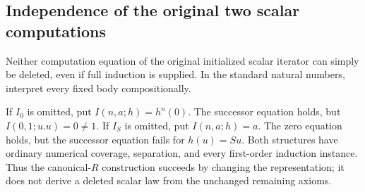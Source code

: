 \subsection{Independence of the original two scalar computations}

Neither computation equation of the original initialized scalar iterator
can simply be deleted, even if full induction is supplied. In the standard
natural numbers, interpret every fixed body compositionally.

If $I_0$ is omitted, put $I(n,a;h)=h^n(0)$. The successor equation holds,
but $I(0,1;u.u)=0\ne1$. If $I_S$ is omitted, put $I(n,a;h)=a$. The zero
equation holds, but the successor equation fails for $h(u)=Su$.
Both structures have ordinary numerical coverage, separation, and every
first-order induction instance. Thus the canonical-$R$ construction succeeds
by changing the representation; it does not derive a deleted scalar law
from the unchanged remaining axioms.

